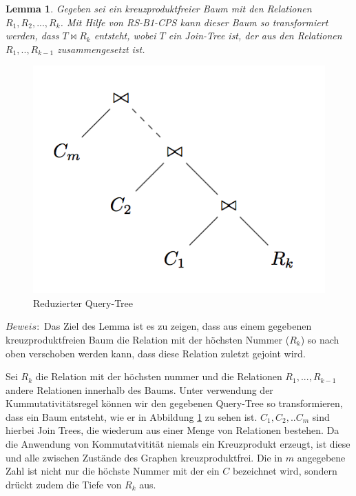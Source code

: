 \newtheorem{lem}{Lemma} 
\newtheorem{teo}{Theorem}
\begin{lem}
Gegeben sei ein kreuzproduktfreier Baum mit den Relationen $R_1, R_2, ... , R_k$. Mit Hilfe von RS-B1-CPS kann dieser Baum so transformiert werden, dass $T \Join R_k$ entsteht, wobei $T$ ein Join-Tree ist, der aus den Relationen $R_1, .., R_{k-1}$ zusammengesetzt ist.
\end{lem}


\begin{figure}[ht]
  \centering
  \includegraphics[scale=0.4]{03_Regeln/00_media/ReducedQueryTree.png}
  \caption{Reduzierter Query-Tree}
  \label{ReducedQueryTree}
\end{figure}



$Beweis:$ Das Ziel des Lemma ist es zu zeigen, dass aus einem gegebenen kreuzproduktfreien Baum die Relation mit der höchsten Nummer ($R_k$) so nach oben verschoben werden kann, dass diese Relation zuletzt gejoint wird.

Sei $R_k$ die Relation mit der höchsten nummer und die Relationen $R_1, ..., R_{k-1}$ andere Relationen innerhalb des Baums. Unter verwendung der Kummutativitätsregel können wir den gegebenen Query-Tree so transformieren, dass ein Baum entsteht, wie er in Abbildung \ref{ReducedQueryTree} zu sehen ist. $C_1, C_2, .. C_m$ sind hierbei Join Trees, die wiederum aus einer Menge von Relationen bestehen. Da die Anwendung von Kommutatvitität niemals ein Kreuzprodukt erzeugt, ist diese und alle zwischen Zustände des Graphen kreuzproduktfrei. Die in $m$ angegebene Zahl ist nicht nur die höchste Nummer mit der ein $C$ bezeichnet wird, sondern drückt zudem die Tiefe von $R_k$ aus.


